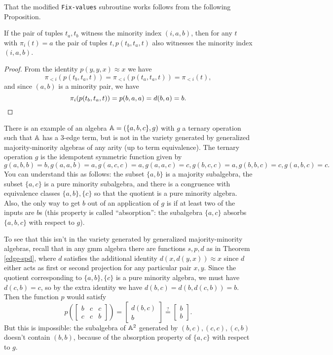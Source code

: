 \documentclass[letterpaper,11pt]{article}
\begin{document}
That the modified \texttt{Fix-values} subroutine works follows from the following Proposition.

\begin{prop} If the pair of tuples $t_a,t_b$ witness the minority index $(i,a,b)$, then for any $t$ with $\pi_i(t) = a$ the pair of tuples $t,p(t_b,t_a,t)$ also witnesses the minority index $(i,a,b)$.
\end{prop}
\begin{proof} From the identity $p(y,y,x) \approx x$ we have
\[
\pi_{<i}(p(t_b,t_a,t)) = \pi_{<i}(p(t_a,t_a,t)) = \pi_{<i}(t),
\]
and since $(a,b)$ is a minority pair, we have
\[
\pi_i(p(t_b,t_a,t)) = p(b,a,a) = d(b,a) = b.\qedhere
\]
\end{proof}

\begin{ex}\label{ex-few-subpowers} There is an example of an algebra $\mathbb{A} = (\{a,b,c\}, g)$ with $g$ a ternary operation such that $\mathbb{A}$ has a $3$-edge term, but is not in the variety generated by generalized majority-minority algebras of any arity (up to term equivalence). The ternary operation $g$ is the idempotent symmetric function given by
\[
g(a,b,b) = b, g(a,a,b) = a, g(a,c,c) = a, g(a,a,c) = c, g(b,c,c) = a, g(b,b,c) = c, g(a,b,c) = c.
\]
You can understand this as follows: the subset $\{a,b\}$ is a majority subalgebra, the subset $\{a,c\}$ is a pure minority subalgebra, and there is a congruence with equivalence classes $\{a,b\}, \{c\}$ so that the quotient is a pure minority algebra. Also, the only way to get $b$ out of an application of $g$ is if at least two of the inputs are $b$s (this property is called ``absorption'': the subalgebra $\{a,c\}$ absorbs $\{a,b,c\}$ with respect to $g$).

To see that this isn't in the variety generated by generalized majority-minority algebras, recall that in any gmm algebra there are functions $s,p,d$ as in Theorem \ref{edge-spd}, where $d$ satisfies the additional identity $d(x,d(y,x)) \approx x$ since $d$ either acts as first or second projection for any particular pair $x,y$. Since the quotient corresponding to $\{a,b\}, \{c\}$ is a pure minority algebra, we must have $d(c,b) = c$, so by the extra identity we have $d(b,c) = d(b,d(c,b)) = b$. Then the function $p$ would satisfy
\[
p\left(\begin{bmatrix} b & c & c\\ c & c & b\end{bmatrix}\right) = \begin{bmatrix} d(b,c)\\ b\end{bmatrix} \stackrel{?}{=} \begin{bmatrix} b\\ b\end{bmatrix}.
\]
But this is impossible: the subalgebra of $\mathbb{A}^2$ generated by $(b,c), (c,c), (c,b)$ doesn't contain $(b,b)$, because of the absorption property of $\{a,c\}$ with respect to $g$.


\end{ex}
\end{document}
